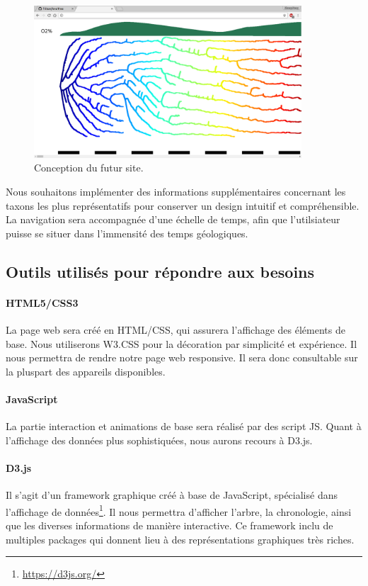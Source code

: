 \documentclass[a4paper]{article}
\begin{document}
		\begin{figure}[!h]
			\centering
			\includegraphics[width=10cm]{./img/site.png}
			\caption{Conception du futur site.}
			\label{design}
		\end{figure}

		Nous souhaitons implémenter des informations supplémentaires concernant les taxons les plus représentatifs pour conserver un design intuitif et compréhensible.
		La navigation sera accompagnée d'une échelle de temps, afin que l'utilsiateur puisse se situer dans l'immensité des temps géologiques.
				

	\subsection{Outils utilisés pour répondre aux besoins}
		\paragraph{HTML5/CSS3}
		La page web sera créé en HTML/CSS, qui assurera l'affichage des éléments de base.
		Nous utiliserons W3.CSS pour la décoration par simplicité et expérience. Il nous permettra de rendre notre page web responsive. Il sera donc consultable sur la pluspart des appareils disponibles.

		\paragraph{JavaScript}
		La partie interaction et animations de base sera réalisé par des script JS. Quant à l'affichage des données plus sophistiquées, nous aurons recours à D3.js.

		\paragraph{D3.js}
		Il s'agit d'un framework graphique créé à base de JavaScript, spécialisé dans l'affichage de données\footnote{\url{https://d3js.org/}}. Il nous permettra d'afficher l'arbre, la chronologie, ainsi que les diverses informations de manière interactive. 
		Ce framework inclu de multiples packages qui donnent lieu à des représentations graphiques très riches. 
\end{document}
